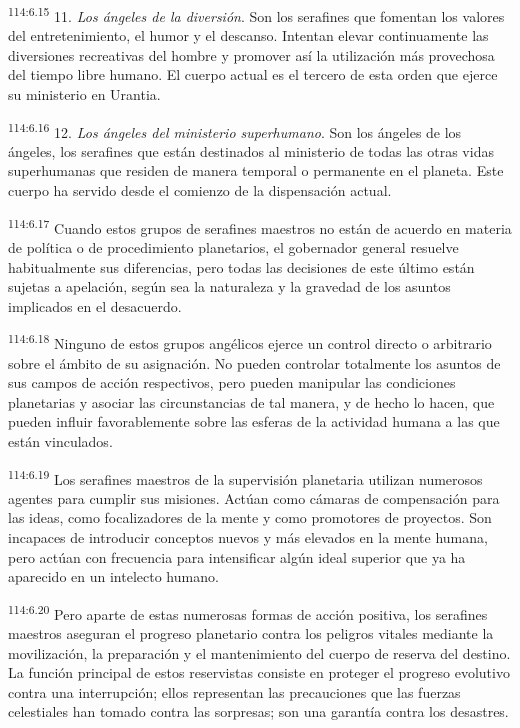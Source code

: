 \documentclass[twoside, 11pt]{book}
\begin{document}
\par
\textsuperscript{114:6.15} 11. \textit{Los ángeles de la diversión}. Son los serafines que fomentan los valores del entretenimiento, el humor y el descanso. Intentan elevar continuamente las diversiones recreativas del hombre y promover así la utilización más provechosa del tiempo libre humano. El cuerpo actual es el tercero de esta orden que ejerce su ministerio en Urantia.

\par
\textsuperscript{114:6.16} 12. \textit{Los ángeles del ministerio superhumano}. Son los ángeles de los ángeles, los serafines que están destinados al ministerio de todas las otras vidas superhumanas que residen de manera temporal o permanente en el planeta. Este cuerpo ha servido desde el comienzo de la dispensación actual.

\par
\textsuperscript{114:6.17} Cuando estos grupos de serafines maestros no están de acuerdo en materia de política o de procedimiento planetarios, el gobernador general resuelve habitualmente sus diferencias, pero todas las decisiones de este último están sujetas a apelación, según sea la naturaleza y la gravedad de los asuntos implicados en el desacuerdo.

\par
\textsuperscript{114:6.18} Ninguno de estos grupos angélicos ejerce un control directo o arbitrario sobre el ámbito de su asignación. No pueden controlar totalmente los asuntos de sus campos de acción respectivos, pero pueden manipular las condiciones planetarias y asociar las circunstancias de tal manera, y de hecho lo hacen, que pueden influir favorablemente sobre las esferas de la actividad humana a las que están vinculados.

\par
\textsuperscript{114:6.19} Los serafines maestros de la supervisión planetaria utilizan numerosos agentes para cumplir sus misiones. Actúan como cámaras de compensación para las ideas, como focalizadores de la mente y como promotores de proyectos. Son incapaces de introducir conceptos nuevos y más elevados en la mente humana, pero actúan con frecuencia para intensificar algún ideal superior que ya ha aparecido en un intelecto humano.

\par
\textsuperscript{114:6.20} Pero aparte de estas numerosas formas de acción positiva, los serafines maestros aseguran el progreso planetario contra los peligros vitales mediante la movilización, la preparación y el mantenimiento del cuerpo de reserva del destino. La función principal de estos reservistas consiste en proteger el progreso evolutivo contra una interrupción; ellos representan las precauciones que las fuerzas celestiales han tomado contra las sorpresas; son una garantía contra los desastres.
\end{document}
